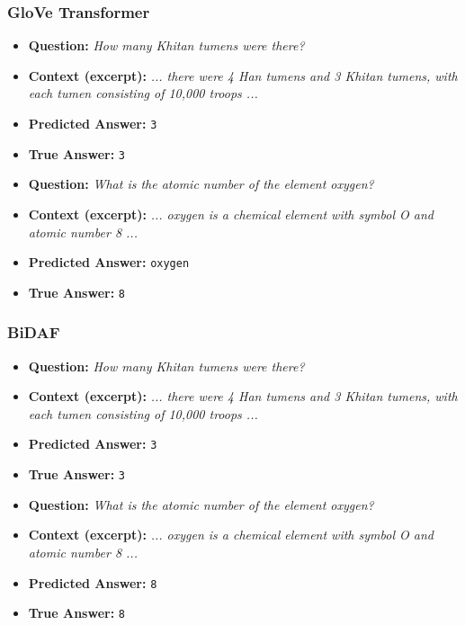 \documentclass[runningheads]{llncs}
\begin{document}
\subsubsection{GloVe Transformer}

\begin{itemize}
    \item \textbf{Question:} \textit{How many Khitan tumens were there?}
    \item \textbf{Context (excerpt):} \textit{... there were 4 Han tumens and 3 Khitan tumens, with each tumen consisting of 10,000 troops ...}
    \item \textbf{Predicted Answer:} \texttt{3}
    \item \textbf{True Answer:} \texttt{3}
\end{itemize}

\begin{itemize}
    \item \textbf{Question:} \textit{What is the atomic number of the element oxygen?}
    \item \textbf{Context (excerpt):} \textit{... oxygen is a chemical element with symbol O and atomic number 8 ...}
    \item \textbf{Predicted Answer:} \texttt{oxygen}
    \item \textbf{True Answer:} \texttt{8}
\end{itemize}

  
\subsubsection{BiDAF}
\begin{itemize}
    \item \textbf{Question:} \textit{How many Khitan tumens were there?}
    \item \textbf{Context (excerpt):} \textit{... there were 4 Han tumens and 3 Khitan tumens, with each tumen consisting of 10,000 troops ...}
    \item \textbf{Predicted Answer:} \texttt{3}
    \item \textbf{True Answer:} \texttt{3}
\end{itemize}

\begin{itemize}
    \item \textbf{Question:} \textit{What is the atomic number of the element oxygen?}
    \item \textbf{Context (excerpt):} \textit{... oxygen is a chemical element with symbol O and atomic number 8 ...}
    \item \textbf{Predicted Answer:} \texttt{8}
    \item \textbf{True Answer:} \texttt{8}
\end{itemize}
  
\end{document}
